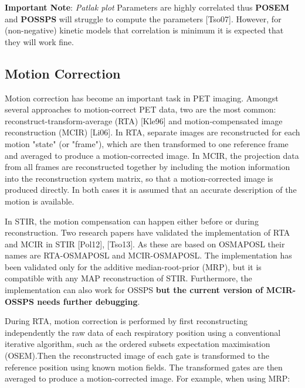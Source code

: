 \documentclass{article}
\begin{document}

\textbf{Important Note}:  \textit{Patlak plot} Parameters are highly correlated thus \textbf{POSEM} and \textbf{POSSPS} will struggle to compute the parameters [Tso07]. However, for (non-negative) kinetic models that correlation is minimum it is expected that they will work fine.


\subsection{
Motion Correction}
\label{sec:motioncorrection}
Motion correction has become an important task in PET imaging. Amongst several approaches to
motion-correct PET data, two are the most common: reconstruct-transform-average (RTA) [Kle96] and
motion-compensated image reconstruction (MCIR) [Li06]. In RTA, separate images are reconstructed for each
motion "state" (or "frame"), which are then transformed to one reference frame and averaged to produce a
motion-corrected image. In MCIR, the projection data from all frames are reconstructed together by
including the motion information into the reconstruction system matrix, so that a motion-corrected image
is produced directly. In both cases it is assumed that an accurate description of the motion is
available.

In STIR, the motion compensation can happen either before or during reconstruction. Two research papers
have validated the implementation of RTA and MCIR in STIR [Pol12], [Tso13]. As these are based on
OSMAPOSL their names are RTA-OSMAPOSL and MCIR-OSMAPOSL. The implementation has been validated only for
the additive median-root-prior (MRP), but it is compatible with any MAP reconstruction of STIR.
Furthermore, the implementation can also work for OSSPS \textbf{but the current version of MCIR-OSSPS
  needs further debugging}.

During RTA, motion correction is performed by first reconstructing independently the raw data of each
respiratory position using a conventional iterative algorithm, such as the ordered subsets expectation
maximisation (OSEM).Then the reconstructed image of each gate is transformed to the reference position
using known motion fields. The transformed gates are then averaged to produce a motion-corrected image.
For example, when using MRP:
\end{document}
